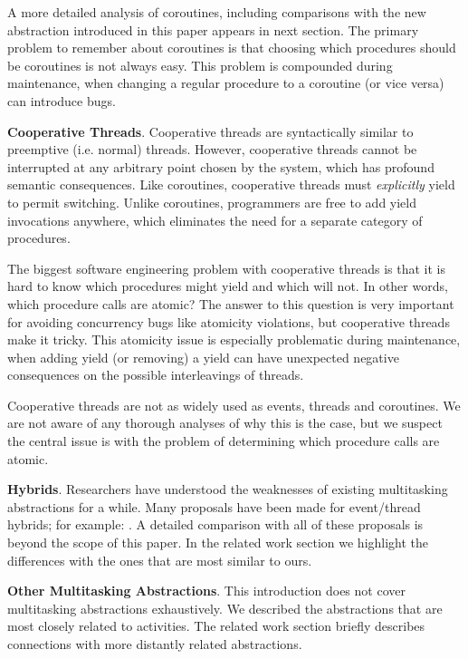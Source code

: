 \documentclass[pldi,10pt,preprint]{sigplanconf-pldi16}
\begin{document}
A more detailed analysis of coroutines, including comparisons with the new abstraction introduced in this paper appears in next section.
The primary problem to remember about coroutines is that choosing which procedures should be coroutines is not always easy.
This problem is compounded during maintenance, when changing a regular procedure to a coroutine (or vice versa) can introduce bugs.

\textbf{Cooperative Threads}.
Cooperative threads are syntactically similar to preemptive (i.e. normal) threads.
However, cooperative threads cannot be interrupted at any arbitrary point chosen by the system, which has profound semantic consequences.
Like coroutines, cooperative threads must \emph{explicitly} yield to permit switching.
Unlike coroutines, programmers are free to add yield invocations anywhere, which eliminates the need for a separate category of procedures.

The biggest software engineering problem with cooperative threads is that it is hard to know which procedures might yield and which will not.
In other words, which procedure calls are atomic?
The answer to this question is very important for avoiding concurrency bugs like atomicity violations, but cooperative threads make it tricky.
This atomicity issue is especially problematic during maintenance, when adding yield (or removing) a yield can have unexpected negative consequences on the possible interleavings of threads.

Cooperative threads are not as widely used as events, threads and coroutines.
We are not aware of any thorough analyses of why this is the case, but we suspect the central issue is with the problem of determining which procedure calls are atomic.

\textbf{Hybrids}.
Researchers have understood the weaknesses of existing multitasking abstractions for a while.
Many proposals have been made for event/thread hybrids; for example: \cite{Boudol2007, Boussinot2006, Cunningham2005, Dabrowski2006, Fischer2007, Kerneis2014, Krohn2007, Li2007, Behren2003}.
A detailed comparison with all of these proposals is beyond the scope of this paper.
In the related work section we highlight the differences with the ones that are most similar to ours.

\textbf{Other Multitasking Abstractions}.
This introduction does not cover multitasking abstractions exhaustively.
We described the abstractions that are most closely related to activities.
The related work section briefly describes connections with more distantly related abstractions.
\end{document}
